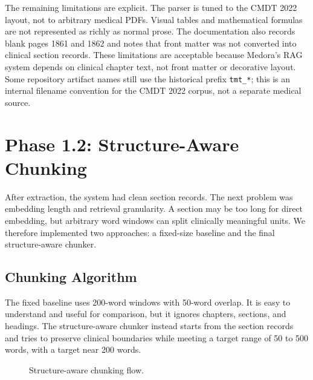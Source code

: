 The remaining limitations are explicit. The parser is tuned to the CMDT 2022 layout, not to arbitrary medical PDFs. Visual tables and mathematical formulas are not represented as richly as normal prose. The documentation also records blank pages 1861 and 1862 and notes that front matter was not converted into clinical section records. These limitations are acceptable because Medora's RAG system depends on clinical chapter text, not front matter or decorative layout. Some repository artifact names still use the historical prefix \texttt{tmt\_*}; this is an internal filename convention for the CMDT 2022 corpus, not a separate medical source.

\section{Phase 1.2: Structure-Aware Chunking}

After extraction, the system had clean section records. The next problem was embedding length and retrieval granularity. A section may be too long for direct embedding, but arbitrary word windows can split clinically meaningful units. We therefore implemented two approaches: a fixed-size baseline and the final structure-aware chunker.

\subsection{Chunking Algorithm}

The fixed baseline uses 200-word windows with 50-word overlap. It is easy to understand and useful for comparison, but it ignores chapters, sections, and headings. The structure-aware chunker instead starts from the section records and tries to preserve clinical boundaries while meeting a target range of 50 to 500 words, with a target near 200 words.

\begin{figure}[htbp]
\centering
{}
\caption{Structure-aware chunking flow.}
\label{fig:chunk_construction}
\end{figure}

